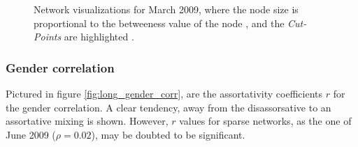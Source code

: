 \begin{figure}[htpb]%
	\centering 
	
	\qquad 			
	\caption[Network visualizations for March 2009]{Network visualizations for March 2009, where the node size is proportional to the betweeness value of the node , and the \textit{Cut-Points} are highlighted .}
	 \label{fig:graphs_march}
\end{figure} 


\subsubsection{Gender correlation}

Pictured in figure \ref{fig:long_gender_corr}, are the assortativity coefficients $r$ for the gender correlation. A clear tendency, away from the disassorsative to an assortative mixing is shown. However, $r$ values for sparse networks, as the one of June 2009 ($\rho = 0.02$), may be doubted to be significant.

